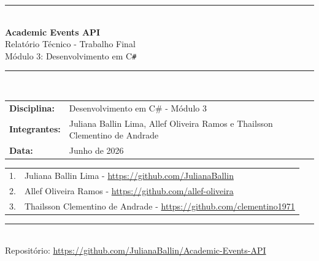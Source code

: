 \documentclass[11pt, a4paper, oneside]{article}
\begin{document}
\begin{titlepage}
\centering
\vspace*{20mm}

{\color{apiblue}\rule{\linewidth}{2pt}}\\[6mm]

{\Huge\bfseries\color{apiblue} Academic Events API}\\[4mm]
{\Large\color{apidark} Relatório Técnico - Trabalho Final}\\[3mm]
{\large\color{apidark} Módulo 3: Desenvolvimento em C\texttt{\#}}\\[8mm]

{\color{apilightblue}\rule{\linewidth}{1pt}}\\[10mm]

\begin{tabular}{ll}
\textbf{Disciplina:} & Desenvolvimento em C\# - Módulo 3 \\[2mm]
\textbf{Integrantes:} & Juliana Ballin Lima, Allef Oliveira Ramos e Thailsson Clementino de Andrade \\[2mm]
\textbf{Data:}       & Junho de 2026 \\[2mm]
\end{tabular}

\vspace{10mm}

\begin{tcolorbox}[requisito, title={Autoria do Relatório}, width=0.85\linewidth]
\begin{tabular}{ll}
1. & Juliana Ballin Lima - \url{https://github.com/JulianaBallin} \\
2. & Allef Oliveira Ramos - \url{https://github.com/allef-oliveira} \\
3. & Thailsson Clementino de Andrade - \url{https://github.com/clementino1971} \\
\end{tabular}
\end{tcolorbox}

\vfill

{\color{apiblue}\rule{\linewidth}{2pt}}\\[4mm]
{\small\color{apidark} Repositório: \url{https://github.com/JulianaBallin/Academic-Events-API}}
\end{titlepage}

\tableofcontents
\newpage
\end{document}
